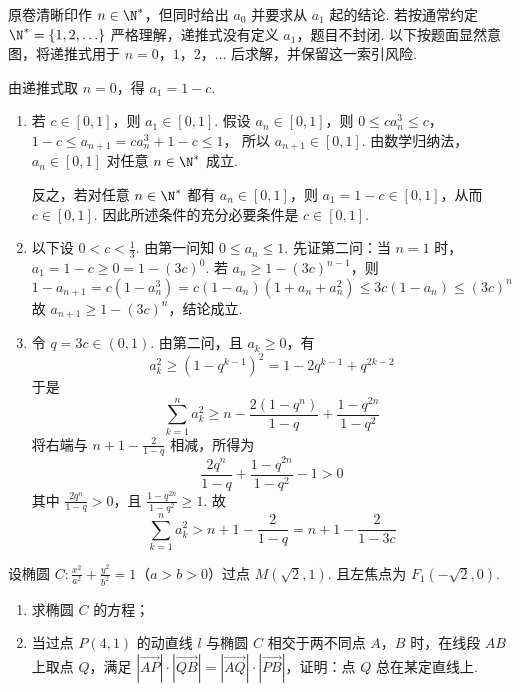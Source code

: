 \begin{solution}
原卷清晰印作 \(n\in\N^*\)，但同时给出 \(a_0\) 并要求从 \(a_1\) 起的结论. 若按通常约定 \(\N^*=\{1,2,\ldots\}\) 严格理解，递推式没有定义 \(a_1\)，题目不封闭. 以下按题面显然意图，将递推式用于 \(n=0\)，\(1\)，\(2\)，\(\ldots\) 后求解，并保留这一索引风险.

由递推式取 \(n=0\)，得 \(a_1=1-c\).

\begin{enumerate}
\item
若 \(c\in[0,1]\)，则 \(a_1\in[0,1]\). 假设 \(a_n\in[0,1]\)，则
\(0\leqslant ca_n^3\leqslant c\)，\(1-c\leqslant a_{n+1}=ca_n^3+1-c\leqslant1\)，
所以 \(a_{n+1}\in[0,1]\). 由数学归纳法，\(a_n\in[0,1]\) 对任意 \(n\in\N^*\) 成立.

反之，若对任意 \(n\in\N^*\) 都有 \(a_n\in[0,1]\)，则 \(a_1=1-c\in[0,1]\)，从而 \(c\in[0,1]\). 因此所述条件的充分必要条件是 \(c\in[0,1]\).

\item
以下设 \(0<c<\frac13\). 由第一问知 \(0\leqslant a_n\leqslant1\). 先证第二问：当 \(n=1\) 时，\(a_1=1-c\geqslant0=1-(3c)^0\). 若 \(a_n\geqslant1-(3c)^{n-1}\)，则
\[
1-a_{n+1}=c(1-a_n^3)=c(1-a_n)(1+a_n+a_n^2)
\leqslant3c(1-a_n)\leqslant(3c)^n
\]
故 \(a_{n+1}\geqslant1-(3c)^n\)，结论成立.

\item
令 \(q=3c\in(0,1)\). 由第二问，且 \(a_k\geqslant0\)，有
\[
a_k^2\geqslant\left(1-q^{k-1}\right)^2
=1-2q^{k-1}+q^{2k-2}
\]
于是
\[
\sum_{k=1}^{n}a_k^2
\geqslant n-\frac{2(1-q^n)}{1-q}+\frac{1-q^{2n}}{1-q^2}
\]
将右端与 \(n+1-\frac{2}{1-q}\) 相减，所得为
\[
\frac{2q^n}{1-q}+\frac{1-q^{2n}}{1-q^2}-1>0
\]
其中 \(\frac{2q^n}{1-q}>0\)，且 \(\frac{1-q^{2n}}{1-q^2}\geqslant1\). 故
\[
\sum_{k=1}^{n}a_k^2>n+1-\frac{2}{1-q}=n+1-\frac{2}{1-3c}
\]
\end{enumerate}
\end{solution}

\begin{problem}
设椭圆 \(C: \frac{x^2}{a^2} + \frac{y^2}{b^2} = 1\)（\(a > b > 0\)）过点 \(M(\sqrt{2}, 1)\). 且左焦点为 \(F_1(-\sqrt{2}, 0)\).

\begin{enumerate}
\item 求椭圆 \(C\) 的方程；
\item 当过点 \(P(4,1)\) 的动直线 \(l\) 与椭圆 \(C\) 相交于两不同点 \(A\)，\(B\) 时，在线段 \(AB\) 上取点 \(Q\)，满足 \(\left|\overrightarrow{AP}\right| \cdot \left|\overrightarrow{QB}\right| = \left|\overrightarrow{AQ}\right| \cdot \left|\overrightarrow{PB}\right|\)，证明：点 \(Q\) 总在某定直线上.
\end{enumerate}
\end{problem}

